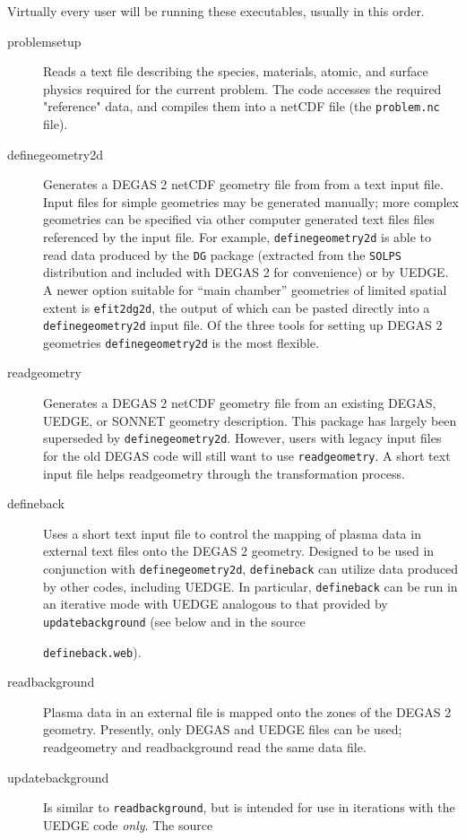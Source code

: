 \documentclass[12pt]{report}
\def\href#1#2{\special{html:<a href="#1">}{#2}\special{html:</a>}}
\begin{document}
Virtually every user will be running these executables,
usually in this order.

\begin{description}
\item[problemsetup] Reads a text file describing the species, 
materials, atomic, and surface physics required for the
current problem. The code
accesses the required "reference" data, and compiles them
into a netCDF file (the {\tt problem.nc} file).
\item[definegeometry2d] Generates a DEGAS 2 netCDF geometry file 
from from a text
input file. Input files for simple geometries may be
generated manually; more complex geometries can be specified via other computer
generated text files
files referenced by the input file. For example, {\tt definegeometry2d} is
able to read data produced by the {\tt DG} package 
(extracted from the {\tt SOLPS} distribution
and included with DEGAS 2 for convenience)
or by UEDGE. A newer option suitable for
``main chamber'' geometries of limited spatial
extent is {\tt efit2dg2d}, the output of which can
be pasted directly into a {\tt definegeometry2d}
input file.
Of the three tools for setting up
DEGAS 2 geometries {\tt definegeometry2d} is the most flexible. 
\item[readgeometry] Generates a DEGAS 2 netCDF geometry file from an
existing DEGAS, UEDGE, or SONNET geometry description. This package has
largely been superseded by {\tt definegeometry2d}.  However, users with legacy
input files for the old DEGAS code will still want to use {\tt readgeometry}.
A short text input file helps readgeometry
through the transformation process.
\item[defineback] Uses a short text input file to control the mapping of plasma
data in external text files onto the DEGAS 2 geometry. Designed to be used in
conjunction with {\tt definegeometry2d}, {\tt defineback} can utilize data
produced by other codes, including UEDGE.  In particular, 
{\tt defineback} can be run in an iterative mode with UEDGE 
analogous to that provided by {\tt updatebackground} (see below
and in the source \href{defineback.pdf#page.13}{file}
{\tt defineback.web}).
\item[readbackground] Plasma data in an external file is mapped onto
the zones of the DEGAS 2 geometry. Presently, only DEGAS and UEDGE files
can be used; readgeometry and readbackground read the same data
file. 
\item[updatebackground] Is similar to {\tt readbackground}, but is intended
for use in iterations with the UEDGE code {\em only}. The source

\end{description}
\end{document}
